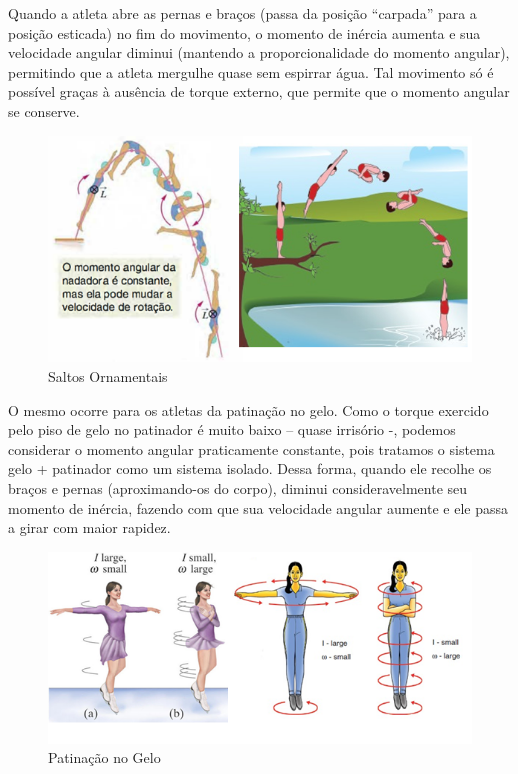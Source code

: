 Quando a atleta abre as pernas e braços (passa da posição “carpada” para a posição esticada) no fim do movimento, o momento de inércia aumenta e sua velocidade angular diminui (mantendo a proporcionalidade do momento angular), permitindo que a atleta mergulhe quase sem espirrar água. Tal movimento só é possível graças à ausência de torque externo, que permite que o momento angular se conserve. \\

\begin{figure}[H]
  \centering
  \includegraphics[scale=1]{images/i1.png}
  \caption{Saltos Ornamentais}
\end{figure}

O mesmo ocorre para os atletas da patinação no gelo. Como o torque exercido pelo piso de gelo no patinador é muito baixo – quase irrisório -, podemos considerar o momento angular praticamente constante, pois tratamos o sistema gelo + patinador como um sistema isolado. Dessa forma, quando ele recolhe os braços e pernas (aproximando-os do corpo), diminui consideravelmente seu momento de inércia, fazendo com que sua velocidade angular aumente e ele passa a girar com maior rapidez.\\ 

\begin{figure}[H]
  \centering
  \includegraphics[scale=1]{images/i2.png}
  \caption{Patinação no Gelo}
\end{figure}

